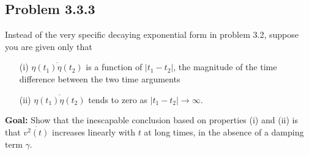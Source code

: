 \subsection{Problem 3.3.3}

Instead of the very specific decaying exponential form in problem 3.2, suppose you are given only that
\begin{itemize}
\item[(i)] $\overline{\eta(t_1) \eta(t_2)}$ is a function of $|t_1-t_2|$, the magnitude of the 
time difference between the two time arguments
\item[(ii)] $\overline{\eta(t_1) \eta(t_2)}$ tends to zero as $|t_1-t_2|\rightarrow\infty$.
\end{itemize}
\textbf{Goal:} Show that the inescapable conclusion based on properties (i) and (ii) is that $\overline{v^2(t)}$ increases linearly with $t$ at long times, in the absence of a damping term $\gamma$.

